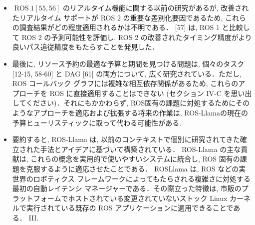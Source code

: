 \begin{frame}{}
    \begin{itemize}
        \item  $\operatorname{ROS} 1[55,56]$ のリアルタイム機能に関する以前の研究があるが, 改善されたリアルタイム サポートが ROS 2 の重要な差別化要因であるため, これらの調査結果がどの程度適用されるかは不明である． [57] は, ROS 1 と比較して ROS 2 の予測可能性を評価し, ROS 2 の改善されたタイミング精度がより良いパス追従精度をもたらすことを発見した．
    \end{itemize}
\end{frame}

\begin{frame}{}
    \begin{itemize}
        \item  最後に, リソース予約の最適な予算と期間を見つける問題は, 個々のタスク [12-15, 58-60] と DAG [61] の両方について, 広く研究されている．ただし, ROS コールバック グラフには複雑な相互依存関係があるため, これらのアプローチを ROS に直接適用することはできない (セクション IV-C を思い出してください)．それにもかかわらず, ROS固有の課題に対処するためにそのようなアプローチを適応および拡張する将来の作業は, ROS-Llamaの現在の予算ヒューリスティックに取って代わる可能性がある.
    \end{itemize}
\end{frame}

\begin{frame}{}
    \begin{itemize}
        \item 要約すると, ROS-Llama は, 以前のコンテキストで個別に研究されてきた確立された手法とアイデアに基づいて構築されている． ROS-Llama の主な貢献は, これらの概念を実用的で使いやすいシステムに統合し, ROS 固有の課題を克服するように適応させたことである． ROSLlama は, ROS などの実世界のロボティクス フレームワークによってもたらされる複雑さに対処する最初の自動レイテンシ マネージャーである．その際立った特徴は, 市販のプラットフォームでホストされている変更されていないストック Linux カーネルで実行されている既存の ROS アプリケーションに適用できることである． III.
    \end{itemize}
\end{frame}
